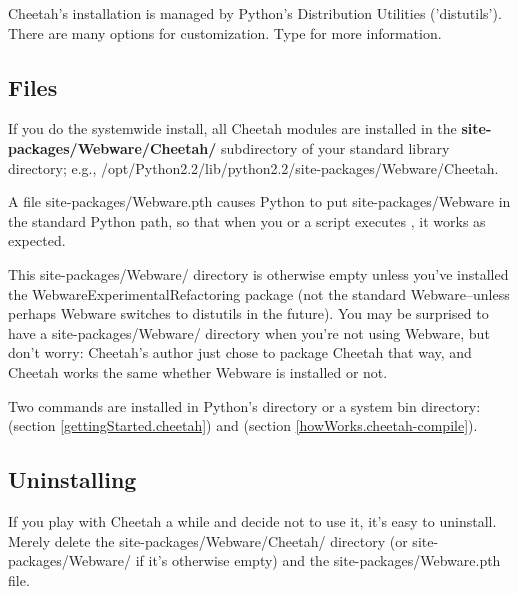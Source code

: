 Cheetah's installation is managed by Python's Distribution Utilities
('distutils').  There are many options for customization.  Type  for more information.

\subsection{Files}
\label{gettingstarted.files}

If you do the systemwide install, all Cheetah modules are installed in the
{\bf site-packages/Webware/Cheetah/} subdirectory of your standard library
directory; e.g., /opt/Python2.2/lib/python2.2/site-packages/Webware/Cheetah.

A file site-packages/Webware.pth causes Python to put 
site-packages/Webware in the standard Python path, so that when you or a
script executes , it works as
expected.

This site-packages/Webware/ directory is otherwise empty unless you've 
installed the WebwareExperimentalRefactoring package (not the standard
Webware--unless perhaps Webware switches to distutils in the future).  You
may be surprised to have a site-packages/Webware/ directory when you're not
using Webware, but don't worry: Cheetah's author just chose to package Cheetah
that way, and Cheetah works the same whether Webware is installed or not.

Two commands are installed in Python's  directory or a system
bin directory:  (section \ref{gettingStarted.cheetah}) and
 (section \ref{howWorks.cheetah-compile}).  

\subsection{Uninstalling}
\label{gettingstarted.uninstalling}


If you play with Cheetah a while and decide not to use it, it's easy to
uninstall.  Merely delete the site-packages/Webware/Cheetah/ directory
(or site-packages/Webware/ if it's otherwise empty) and the
site-packages/Webware.pth file.



